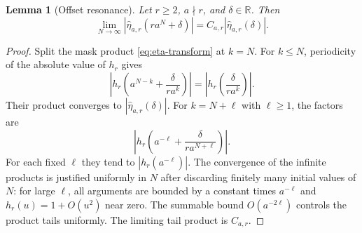 \documentclass[11pt,a4paper]{article}
\newtheorem{lemma}[theorem]{Lemma}
\theoremstyle{definition}
\theoremstyle{remark}
\newcommand{\R}{\mathbb R}
\begin{document}
\begin{lemma}[Offset resonance]\label{lem:offset}
Let $r\ge2$, $a\nmid r$, and $\delta\in\R$. Then
\begin{equation}\label{eq:offset}
 \lim_{N\to\infty}|\widehat\eta_{a,r}(ra^N+\delta)|
 =C_{a,r}|\widehat\eta_{a,r}(\delta)|.
\end{equation}
\end{lemma}
\begin{proof}
Split the mask product \eqref{eq:eta-transform} at $k=N$. For $k\le N$,
periodicity of the absolute value of $h_r$ gives
\[
 \left|h_r\left(a^{N-k}+\frac{\delta}{ra^k}\right)\right|
 =\left|h_r\left(\frac{\delta}{ra^k}\right)\right|.
\]
Their product converges to $|\widehat\eta_{a,r}(\delta)|$.
For $k=N+\ell$ with $\ell\ge1$, the factors are
\[
 \left|h_r\left(a^{-\ell}+\frac{\delta}{ra^{N+\ell}}\right)\right|.
\]
For each fixed $\ell$ they tend to $|h_r(a^{-\ell})|$. The convergence
of the infinite products is justified uniformly in $N$ after discarding
finitely many initial values of $N$: for large $\ell$, all arguments are
bounded by a constant times $a^{-\ell}$ and
$h_r(u)=1+O(u^2)$ near zero. The summable bound $O(a^{-2\ell})$ controls
the product tails uniformly. The limiting tail product is $C_{a,r}$.
\end{proof}
\end{document}
